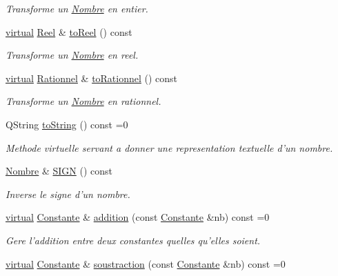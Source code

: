 \begin{DoxyCompactItemize}
\begin{DoxyCompactList}\small\item\em \-Transforme un \hyperlink{class_l_o21_1_1_nombre}{\-Nombre} en entier. \end{DoxyCompactList}\item 
\hyperlink{classvirtual}{virtual} \hyperlink{class_l_o21_1_1_reel}{\-Reel} \& \hyperlink{class_l_o21_1_1_nombre_a778c4e954d3bfb9a226b4fb618441a56}{to\-Reel} () const 
\begin{DoxyCompactList}\small\item\em \-Transforme un \hyperlink{class_l_o21_1_1_nombre}{\-Nombre} en reel. \end{DoxyCompactList}\item 
\hyperlink{classvirtual}{virtual} \hyperlink{class_l_o21_1_1_rationnel}{\-Rationnel} \& \hyperlink{class_l_o21_1_1_nombre_a89c9efd6230695a6ace9605a2a82ee96}{to\-Rationnel} () const 
\begin{DoxyCompactList}\small\item\em \-Transforme un \hyperlink{class_l_o21_1_1_nombre}{\-Nombre} en rationnel. \end{DoxyCompactList}\item 
\-Q\-String \hyperlink{class_l_o21_1_1_nombre_a081a338b80d4f51048c0729597708c24}{to\-String} () const =0
\begin{DoxyCompactList}\small\item\em \-Methode virtuelle servant a donner une representation textuelle d'un nombre. \end{DoxyCompactList}\item 
\hyperlink{class_l_o21_1_1_nombre}{\-Nombre} \& \hyperlink{class_l_o21_1_1_nombre_ac420c18d67faf83c1e0751be1c69579d}{\-S\-I\-G\-N} () const 
\begin{DoxyCompactList}\small\item\em \-Inverse le signe d'un nombre. \end{DoxyCompactList}\item 
\hyperlink{classvirtual}{virtual} \hyperlink{class_l_o21_1_1_constante}{\-Constante} \& \hyperlink{class_l_o21_1_1_nombre_a75c7a5c063ed122f7ba004e09f1f6621}{addition} (const \hyperlink{class_l_o21_1_1_constante}{\-Constante} \&nb) const =0
\begin{DoxyCompactList}\small\item\em \-Gere l'addition entre deux constantes quelles qu'elles soient. \end{DoxyCompactList}\item 
\hyperlink{classvirtual}{virtual} \hyperlink{class_l_o21_1_1_constante}{\-Constante} \& \hyperlink{class_l_o21_1_1_nombre_a1e412b0e89c0b68c0ee04a3078c098b1}{soustraction} (const \hyperlink{class_l_o21_1_1_constante}{\-Constante} \&nb) const =0

\end{DoxyCompactItemize}

